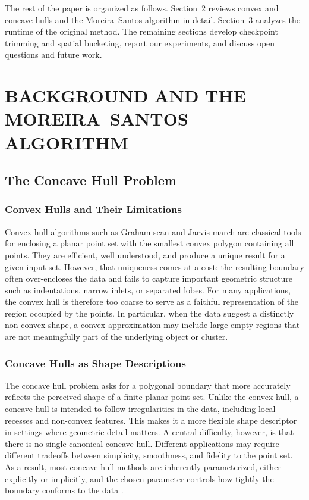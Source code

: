 \documentclass[a4paper,twoside]{article}
\begin{document}
The rest of the paper is organized as follows. Section~2 reviews convex and concave hulls and the Moreira--Santos algorithm in detail. Section~3 analyzes the runtime of the original method. The remaining sections develop checkpoint trimming and spatial bucketing, report our experiments, and discuss open questions and future work.
\section{\uppercase{Background and the Moreira--Santos Algorithm}}
\subsection{The Concave Hull Problem}
\subsubsection{Convex Hulls and Their Limitations}
Convex hull algorithms such as Graham scan \cite{graham1972} and Jarvis march \cite{jarvis1973} are classical tools for enclosing a planar point set with the smallest convex polygon containing all points. They are efficient, well understood, and produce a unique result for a given input set. However, that uniqueness comes at a cost: the resulting boundary often over-encloses the data and fails to capture important geometric structure such as indentations, narrow inlets, or separated lobes.
For many applications, the convex hull is therefore too coarse to serve as a faithful representation of the region occupied by the points. In particular, when the data suggest a distinctly non-convex shape, a convex approximation may include large empty regions that are not meaningfully part of the underlying object or cluster.
\subsubsection{Concave Hulls as Shape Descriptions}
The concave hull problem asks for a polygonal boundary that more accurately reflects the perceived shape of a finite planar point set. Unlike the convex hull, a concave hull is intended to follow irregularities in the data, including local recesses and non-convex features. This makes it a more flexible shape descriptor in settings where geometric detail matters.
A central difficulty, however, is that there is no single canonical concave hull. Different applications may require different tradeoffs between simplicity, smoothness, and fidelity to the point set. As a result, most concave hull methods are inherently parameterized, either explicitly or implicitly, and the chosen parameter controls how tightly the boundary conforms to the data \cite{galton2006,duckham2008}.
\end{document}
